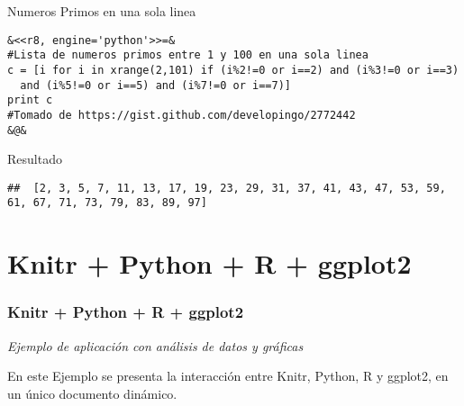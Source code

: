 \documentclass[11pt]{beamer}					%
\begin{document}
			\begin{frame}[fragile]
					\begin{block}{Numeros Primos en una sola linea}
					\begin{tiny}\begin{lstlisting}[frame=single,style=base]				
&<<r8, engine='python'>>=&
#Lista de numeros primos entre 1 y 100 en una sola linea
c = [i for i in xrange(2,101) if (i%2!=0 or i==2) and (i%3!=0 or i==3) 
  and (i%5!=0 or i==5) and (i%7!=0 or i==7)]
print c
#Tomado de https://gist.github.com/developingo/2772442
&@&
				\end{lstlisting}	\end{tiny}
				\end{block}	
				\begin{block}{Resultado}
					\begin{tiny}\begin{lstlisting}[frame=single,style=base]				
##  [2, 3, 5, 7, 11, 13, 17, 19, 23, 29, 31, 37, 41, 43, 47, 53, 59, 61, 67, 71, 73, 79, 83, 89, 97]
				\end{lstlisting}	\end{tiny}
				\end{block}
						
			\end{frame}			
			
\section{Knitr + Python + R + ggplot2}	
		 \begin{frame}[fragile]
			\frametitle{Knitr + Python + R + ggplot2}
			\begin{huge}
			\begin{center}
				\emph{\textit{Ejemplo de aplicación con análisis de datos y gráficas}}
			\end{center}
			\end{huge}
			\begin{block}{}
En este Ejemplo se presenta la interacción entre Knitr, Python, R y ggplot2, en un único documento dinámico.
\end{block}

		\end{frame}	
		
\end{document}
